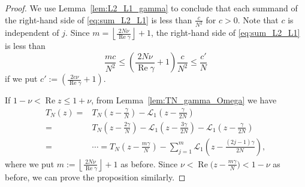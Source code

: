 \documentclass[a4paper,dvipdfmx]{amsart}
\theoremstyle{plain}
\theoremstyle{definition}
\theoremstyle{remark}
\renewcommand{\L}{\mathcal{L}}
\renewcommand{\Re}{\operatorname{Re}}
\numberwithin{equation}{section}
\begin{document}
\begin{proof}
We use Lemma~\ref{lem:L2_L1_gamma} to conclude that each summand of the right-hand side of \eqref{eq:sum_L2_L1} is less than $\frac{c}{N^2}$ for $c>0$.
Note that $c$ is independent of $j$.
Since $m=\left\lfloor\frac{2N\nu}{\Re\gamma}\right\rfloor+1$, the right-hand side of \eqref{eq:sum_L2_L1} is less than
\begin{equation*}
  \frac{mc}{N^2}
  \le
  \left(\frac{2N\nu}{\Re\gamma}+1\right)
  \frac{c}{N^2}
  \le
  \frac{c'}{N}
\end{equation*}
if we put $c':=\left(\frac{2c\nu}{\Re\gamma}+1\right)$.
\par
If $1-\nu<\Re{z}\le1+\nu$, from Lemma~\ref{lem:TN_gamma_Omega} we have
\begin{equation*}
\begin{split}
  T_{N}(z)
  =&
  T_{N}\left(z-\frac{\gamma}{N}\right)
  -
  \L_1\left(z-\frac{\gamma}{2N}\right)
  \\
  =&
  T_{N}\left(z-\frac{2\gamma}{N}\right)
  -
  \L_1\left(z-\frac{3\gamma}{2N}\right)
  -
  \L_1\left(z-\frac{\gamma}{2N}\right)
  \\
  =&\cdots
  =
  T_{N}\left(z-\frac{m\gamma}{N}\right)
  -
  \sum_{j=1}^{m}\L_1\left(z-\frac{(2j-1)\gamma}{2N}\right),
\end{split}
\end{equation*}
where we put $m:=\left\lfloor\frac{2N\nu}{\Re\gamma}\right\rfloor+1$ as before.
Since $\nu<\Re\bigl(z-\frac{m\gamma}{N}\bigr)<1-\nu$ as before, we can prove the proposition similarly.
\end{proof}
\end{document}
